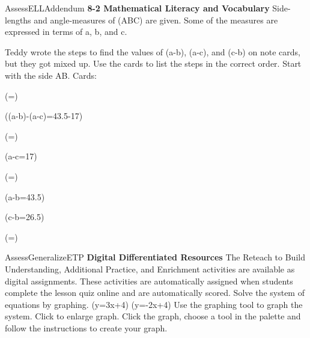 \documentclass{article}
\newenvironment{te-addendum}[2]{}{}     %
\newcommand{\answer}[1]{}               %
\newcommand{\placeholder}[2]{}          %
\newcommand{\te}[1]{}                   %
\begin{document}
\begin{te-addendum}{Assess}{ELLAddendum}
\textbf{8-2 Mathematical Literacy and Vocabulary}
Side-lengths and angle-measures of (\triangle ABC) are given. Some of the measures are expressed in terms of a, b, and c.
\placeholder{diagram}{Black triangle ABC, horizontal base B left C right labeled 49, A above near left. AB a-c, AC a-b; angles A 100°, B 60°, C 20°.}
Teddy wrote the steps to find the values of (a-b), (a-c), and (c-b) on note cards, but they got mixed up. Use the cards to list the steps in the correct order. Start with the side AB.
Cards:
\item (=)
\item ((a-b)-(a-c)=43.5-17)
\item (=)
\item (a-c=17)
\item (=)
\item (a-b=43.5)
\item (c-b=26.5)
\item (=)
\answer{1. (\frac{\sin100}{49}=\frac{\sin20}{a-c})}
\answer{2. (\frac{0.98}{49}=\frac{0.34}{a-c})}
\answer{3. (a-c=17)}
\answer{4. (\frac{\sin100}{49}=\frac{\sin60}{a-b})}
\answer{5. (\frac{0.98}{49}=\frac{0.87}{a-b})}
\answer{6. (a-b=43.5)}
\answer{7. ((a-b)-(a-c)=43.5-17)}
\answer{8. (c-b=26.5)}
\te{Printed cards repeat the 0.34/(a-c) equation; likely one should be the 0.87/(a-b) equation used in answer 5.}
\end{te-addendum}
\begin{te-addendum}{Assess}{GeneralizeETP}
\textbf{Digital Differentiated Resources}
The Reteach to Build Understanding, Additional Practice, and Enrichment activities are available as digital assignments. These activities are automatically assigned when students complete the lesson quiz online and are automatically scored.
Solve the system of equations by graphing.
(y=3x+4)
(y=-2x+4)
Use the graphing tool to graph the system.
Click to enlarge graph.
Click the graph, choose a tool in the palette and follow the instructions to create your graph.
\placeholder{illustration}{Black landscape tablet with home button left, white MathXL screen. System equations left, empty coordinate grid upper right, arrowed x,y axes, unit grid and labels -10,-8,...,10. Question Help menu Help Me Solve This, View an Example, Video, Textbook, Glossary, Math Tools, Print. Footer Review progress, Question 5 of 14, Go, Back, Next, Check Answer, Clear All; 1 part remaining.}
\end{te-addendum}
\end{document}
